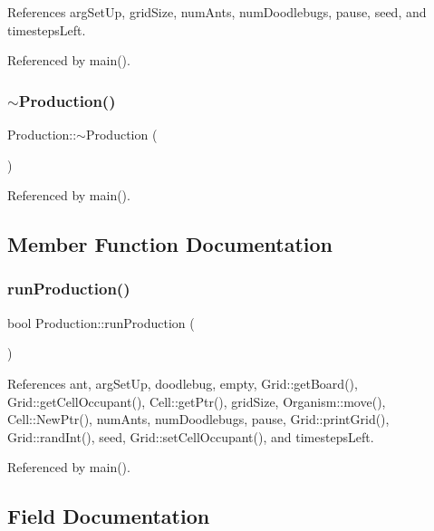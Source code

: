 References arg\+Set\+Up, grid\+Size, num\+Ants, num\+Doodlebugs, pause, seed, and timesteps\+Left.



Referenced by main().

\mbox{\label{classProduction_ab5b3060f9e0a2bc189844e426d693dab}} 
\subsubsection{$\sim$\+Production()}
{\footnotesize\ttfamily Production\+::$\sim$\+Production (\begin{DoxyParamCaption}{ }\end{DoxyParamCaption})\hspace{0.3cm}{\ttfamily [virtual]}}



Referenced by main().



\subsection{Member Function Documentation}
\mbox{\label{classProduction_a1d66853eafae2580089eff44f12f07ba}} 
\subsubsection{run\+Production()}
{\footnotesize\ttfamily bool Production\+::run\+Production (\begin{DoxyParamCaption}{ }\end{DoxyParamCaption})}



References ant, arg\+Set\+Up, doodlebug, empty, Grid\+::get\+Board(), Grid\+::get\+Cell\+Occupant(), Cell\+::get\+Ptr(), grid\+Size, Organism\+::move(), Cell\+::\+New\+Ptr(), num\+Ants, num\+Doodlebugs, pause, Grid\+::print\+Grid(), Grid\+::rand\+Int(), seed, Grid\+::set\+Cell\+Occupant(), and timesteps\+Left.



Referenced by main().



\subsection{Field Documentation}
\mbox{\label{classProduction_aec26b656d2e7519d1a1898810bd1c0da}} 
